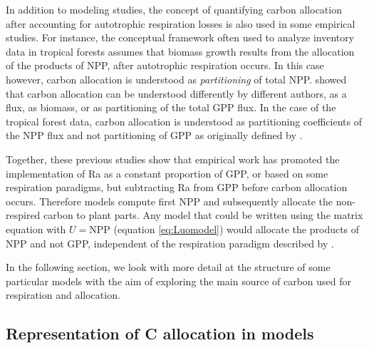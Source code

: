 \documentclass[12pt, a4paper]{article}
\begin{document}
In addition to modeling studies, the concept of quantifying carbon allocation after accounting for autotrophic respiration losses is also used in some empirical studies. For instance, the conceptual framework often used to analyze inventory data in tropical forests \citep[e.g.][]{Malhi2011, Malhi2015} assumes that biomass growth results from the allocation of the products of NPP, after autotrophic respiration occurs. In this case however, carbon allocation is understood as \emph{partitioning} of total NPP. \citet{Litton2007} showed that carbon allocation can be understood differently by different authors, as a flux, as biomass, or as partitioning of the total GPP flux. In the case of the tropical forest data, carbon allocation is understood as partitioning coefficients of the NPP flux and not partitioning of GPP as originally defined by \citet{Litton2007}.  

Together, these previous studies show that empirical work has promoted the implementation of Ra as a constant proportion of GPP, or based on some respiration paradigms, but subtracting Ra from GPP before carbon allocation occurs. Therefore models compute first NPP and subsequently allocate the non-respired carbon to plant parts. Any model that could be written using the matrix equation with $U = \mathrm{NPP}$ (equation \ref{eq:Luomodel}) would allocate the products of NPP and not GPP, independent of the respiration paradigm described by \citet{Amthor2000}. 

In the following section, we look with more detail at the structure of some particular models with the aim of exploring the main source of carbon used for respiration and allocation.


\subsection{Representation of C allocation in models} 
\end{document}
